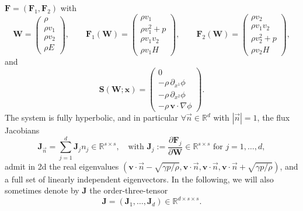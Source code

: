 \documentclass[a4paper,10pt]{article}
\begin{document}
$\mathbf{F}=(\mathbf{F}_1,\mathbf{F}_2)$ with
\begin{equation}\label{Euler_Eq4}
	\bm{W} =
	\begin{pmatrix}
		\rho \\[5pt]
		\rho v_1 \\[5pt]
		\rho v_2 \\[5pt]
		\rho E
	\end{pmatrix}, \qquad
	\mathbf{F}_1 (\bm{W}) =
	\begin{pmatrix}
		\rho v_1 \\[5pt]
		\rho v_1^2 + p \\[5pt]
		\rho v_1 v_2 \\[5pt]
		\rho v_1 H
	\end{pmatrix}, \qquad
	\mathbf{F}_2 (\bm{W}) =
	\begin{pmatrix}
		\rho v_2 \\[5pt]
		\rho v_1 v_2 \\[5pt]
		\rho v_2^2 + p \\[5pt]
		\rho v_2 H
	\end{pmatrix},
\end{equation}
and
\begin{equation}\label{Euler_Eq4b}
	\mathbf{S}(\bm W;\mathbf x)=
	\begin{pmatrix}
		0 \\[5pt]
		-\rho\,\partial_{x^1}\phi \\[5pt]
		-\rho\,\partial_{x^2}\phi \\[5pt]
		-\rho\,\mathbf v\cdot \nabla\phi
	\end{pmatrix}.
\end{equation}
The system is fully hyperbolic, and in particular  $\forall \vec n \in\mathbb{R}^d$ with $|\vec n|=1$,
the flux Jacobians
\begin{equation}\label{Euler_Eq5}
\mathbf{J}_{\vec n} = \sum_{j=1}^d \mathbf{J}_{j} n_j\in \mathbb R^{ s\times s},\quad \text{with }
\mathbf{J}_{j} := \dfrac{\partial\mathbf{F}_j}{\partial\bm{W}} \in \mathbb R^{ s\times s} \text{ for }j=1,\dots, d, 
\end{equation}
admit in  2d the  real eigenvalues $( \mathbf{v} \cdot \vec n - \sqrt{\gamma p/\rho},  \mathbf{v} \cdot \vec n,  \mathbf{v} \cdot \vec n,  \mathbf{v} \cdot \vec n +  \sqrt{\gamma p/\rho} )$, and a full set of linearly independent eigenvectors.  In the following, we will also sometimes denote by $\mathbf{J}$ the order-three-tensor
\begin{equation}\label{Euler_Eq6b}
\mathbf{J} = (\mathbf{J}_1,\dots,\mathbf{J}_d) \in \mathbb R^{d\times s \times s}.
\end{equation}
\end{document}
